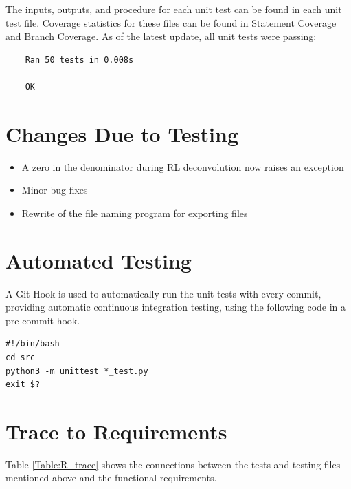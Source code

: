 \documentclass[12pt, titlepage]{article}
\begin{document}
The inputs, outputs, and procedure for each unit test can be found in each unit
test file. Coverage statistics for these files can be found in
\hyperref[ssec:StatCov]{Statement Coverage} and \hyperref[ssec:BrCov]{Branch
    Coverage}. As of the latest update, all unit tests were passing:

\begin{lstlisting}
    Ran 50 tests in 0.008s
    
    OK
\end{lstlisting}

\section{Changes Due to Testing}
\begin{itemize}
    \item A zero in the denominator during RL deconvolution now raises an
    exception
    \item Minor bug fixes
    \item Rewrite of the file naming program for exporting files
\end{itemize}

\section{Automated Testing}
A Git Hook is used to automatically run the unit tests with every commit,
providing automatic continuous integration testing, using the following code in
a pre-commit hook.
\begin{lstlisting}
#!/bin/bash
cd src
python3 -m unittest *_test.py
exit $?
\end{lstlisting}

\section{Trace to Requirements}
Table \ref{Table:R_trace} shows the connections between the tests and testing
files mentioned above and the functional requirements.
\end{document}
